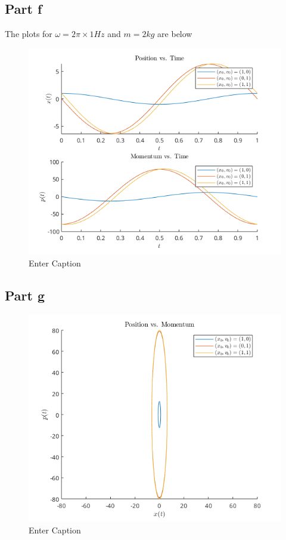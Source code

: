 \subsection*{Part f}
The plots for $\omega = 2\pi \times 1 Hz$ and $m = 2kg$ are below
\begin{figure}[h]
    \centering
    \includegraphics[width=1\linewidth]{Resources//245//Homework 4/245 Homework 4 Problem 2f.png}
    \caption{Enter Caption}
    \label{fig:enter-label}
\end{figure}

\newpage
\subsection*{Part g}
\begin{figure}[h]
    \centering
    \includegraphics[width=1\linewidth]{Resources//245//Homework 4/245 Homework 4 Problem 2g.png}
    \caption{Enter Caption}
    \label{fig:enter-label}
\end{figure}

